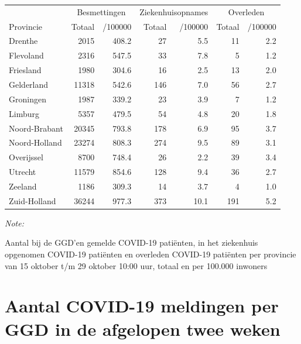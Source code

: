 \documentclass[
  english,
  man,floatsintext]{apa6}
\begin{document}
\begin{table}[H]
\centering
\begin{threeparttable}
\begin{tabular}{lrrrrrr}
\toprule
\multicolumn{1}{c}{ } & \multicolumn{2}{c}{Besmettingen} & \multicolumn{2}{c}{Ziekenhuisopnames} & \multicolumn{2}{c}{Overleden} \\
\cmidrule(l{3pt}r{3pt}){2-3} \cmidrule(l{3pt}r{3pt}){4-5} \cmidrule(l{3pt}r{3pt}){6-7}
Provincie & Totaal & /100000 & Totaal & /100000 & Totaal & /100000\\
\midrule
Drenthe & 2015 & 408.2 & 27 & 5.5 & 11 & 2.2\\
Flevoland & 2316 & 547.5 & 33 & 7.8 & 5 & 1.2\\
Friesland & 1980 & 304.6 & 16 & 2.5 & 13 & 2.0\\
Gelderland & 11318 & 542.6 & 146 & 7.0 & 56 & 2.7\\
Groningen & 1987 & 339.2 & 23 & 3.9 & 7 & 1.2\\
Limburg & 5357 & 479.5 & 54 & 4.8 & 20 & 1.8\\
Noord-Brabant & 20345 & 793.8 & 178 & 6.9 & 95 & 3.7\\
Noord-Holland & 23274 & 808.3 & 274 & 9.5 & 89 & 3.1\\
Overijssel & 8700 & 748.4 & 26 & 2.2 & 39 & 3.4\\
Utrecht & 11579 & 854.6 & 128 & 9.4 & 36 & 2.7\\
Zeeland & 1186 & 309.3 & 14 & 3.7 & 4 & 1.0\\
Zuid-Holland & 36244 & 977.3 & 373 & 10.1 & 191 & 5.2\\
\bottomrule
\end{tabular}
\begin{tablenotes}
\item \textit{Note: } 
\item Aantal bij de GGD’en gemelde COVID-19 patiënten, in het ziekenhuis opgenomen COVID-19 patiënten en overleden COVID-19 patiënten per provincie van 15 oktober t/m 29 oktober 10:00 uur, totaal en per 100.000 inwoners
\end{tablenotes}
\end{threeparttable}
\end{table}

\newpage

\hypertarget{aantal-covid-19-meldingen-per-ggd-in-de-afgelopen-twee-weken}{%
\section{Aantal COVID-19 meldingen per GGD in de afgelopen twee weken}\label{aantal-covid-19-meldingen-per-ggd-in-de-afgelopen-twee-weken}}
\end{document}

